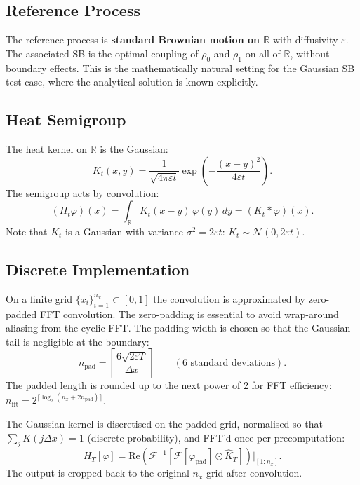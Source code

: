 \documentclass[11pt]{article}
\newcommand{\eps}{\varepsilon}
\newcommand{\dx}{\Delta x}
\newcommand{\RR}{\mathbb{R}}
\theoremstyle{remark}
\begin{document}
\subsection{Reference Process}

The reference process is \textbf{standard Brownian motion on $\RR$} with diffusivity
$\eps$.
The associated SB is the optimal coupling of $\rho_0$ and $\rho_1$ on all of $\RR$,
without boundary effects.
This is the mathematically natural setting for the Gaussian SB test case, where the
analytical solution is known explicitly.

\subsection{Heat Semigroup}

The heat kernel on $\RR$ is the Gaussian:
\begin{equation}
  K_t(x, y) = \frac{1}{\sqrt{4\pi\eps t}} \exp\!\left(-\frac{(x-y)^2}{4\eps t}\right).
\end{equation}
The semigroup acts by convolution:
\begin{equation}
  (H_t \varphi)(x) = \int_\RR K_t(x-y)\, \varphi(y)\, dy
                   = (K_t * \varphi)(x).
\end{equation}
Note that $K_t$ is a Gaussian with variance $\sigma^2 = 2\eps t$:
$K_t \sim \mathcal{N}(0, 2\eps t)$.

\subsection{Discrete Implementation}

On a finite grid $\{x_i\}_{i=1}^{n_x} \subset [0,1]$ the convolution is approximated by
zero-padded FFT convolution.
The zero-padding is essential to avoid wrap-around aliasing from the cyclic FFT.
The padding width is chosen so that the Gaussian tail is negligible at the boundary:
\begin{equation}
  n_{\mathrm{pad}} = \left\lceil \frac{6\sqrt{2\eps T}}{\dx} \right\rceil
  \qquad (\text{6 standard deviations}).
\end{equation}
The padded length is rounded up to the next power of 2 for FFT efficiency:
$n_{\mathrm{fft}} = 2^{\lceil \log_2(n_x + 2 n_{\mathrm{pad}}) \rceil}$.

The Gaussian kernel is discretised on the padded grid, normalised so that
$\sum_j K(j\dx) = 1$ (discrete probability), and FFT'd once per precomputation:
\begin{equation}
  H_T[\varphi] = \mathrm{Re}\!\left(
    \mathcal{F}^{-1}\!\left[\mathcal{F}[\varphi_{\mathrm{pad}}] \odot \hat K_T\right]
  \right)\!\big|_{[1:n_x]}.
\end{equation}
The output is cropped back to the original $n_x$ grid after convolution.
\end{document}
